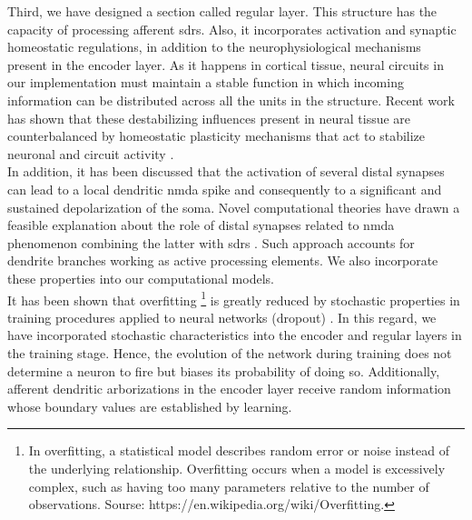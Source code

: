 \documentclass[11pt,a4paper]{article}
\begin{document}
Third, we have designed a section called regular layer. This structure has the capacity of
processing afferent \glspl{sdr}. Also,
it incorporates activation and synaptic homeostatic regulations,
in addition to the neurophysiological
mechanisms present in the encoder layer.
As it happens in cortical tissue, neural circuits in our implementation
must maintain a stable function in which incoming information can be distributed
across all the units in the structure.
Recent work has shown that these destabilizing influences present in neural tissue
are counterbalanced
by homeostatic plasticity mechanisms that act to stabilize neuronal
and circuit activity \cite{turrigiano_2012}. \\

In addition, it has been discussed  %
that the activation of several distal
synapses can lead to a local dendritic \gls{nmda}
spike and consequently to a significant
and sustained depolarization of the soma.
Novel computational theories have drawn a feasible explanation
about the role of distal synapses related to \gls{nmda}
phenomenon \cite{hawkins_2016}
combining the latter with \glspl{sdr} \cite{ahmad_2016}.
Such approach accounts for dendrite branches working as active processing elements.
We also incorporate these properties into our computational models. \\

It has been shown that overfitting
\footnote{In overfitting, a statistical model describes random error or noise instead of the underlying relationship. %
Overfitting occurs when a model is excessively complex, such as having too many parameters relative to the number of observations. %
Sourse: https://en.wikipedia.org/wiki/Overfitting.}
is greatly reduced by
stochastic properties in training procedures
applied to neural networks (dropout) \cite{JMLR:v15:srivastava14a}.
In this regard, we have incorporated stochastic characteristics into
the encoder and regular layers in the training stage.
Hence, the evolution of the network during training does not
determine a neuron to fire but biases its probability
of doing so. Additionally, afferent dendritic arborizations
in the encoder layer receive random information whose
boundary values are established by learning. \\
\end{document}
